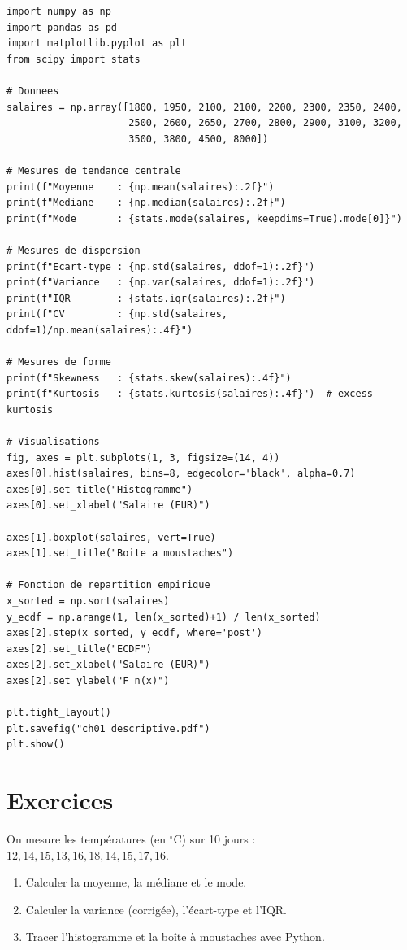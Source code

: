 \begin{python}
\begin{verbatim}
import numpy as np
import pandas as pd
import matplotlib.pyplot as plt
from scipy import stats

# Donnees
salaires = np.array([1800, 1950, 2100, 2100, 2200, 2300, 2350, 2400,
                     2500, 2600, 2650, 2700, 2800, 2900, 3100, 3200,
                     3500, 3800, 4500, 8000])

# Mesures de tendance centrale
print(f"Moyenne    : {np.mean(salaires):.2f}")
print(f"Mediane    : {np.median(salaires):.2f}")
print(f"Mode       : {stats.mode(salaires, keepdims=True).mode[0]}")

# Mesures de dispersion
print(f"Ecart-type : {np.std(salaires, ddof=1):.2f}")
print(f"Variance   : {np.var(salaires, ddof=1):.2f}")
print(f"IQR        : {stats.iqr(salaires):.2f}")
print(f"CV         : {np.std(salaires, ddof=1)/np.mean(salaires):.4f}")

# Mesures de forme
print(f"Skewness   : {stats.skew(salaires):.4f}")
print(f"Kurtosis   : {stats.kurtosis(salaires):.4f}")  # excess kurtosis

# Visualisations
fig, axes = plt.subplots(1, 3, figsize=(14, 4))
axes[0].hist(salaires, bins=8, edgecolor='black', alpha=0.7)
axes[0].set_title("Histogramme")
axes[0].set_xlabel("Salaire (EUR)")

axes[1].boxplot(salaires, vert=True)
axes[1].set_title("Boite a moustaches")

# Fonction de repartition empirique
x_sorted = np.sort(salaires)
y_ecdf = np.arange(1, len(x_sorted)+1) / len(x_sorted)
axes[2].step(x_sorted, y_ecdf, where='post')
axes[2].set_title("ECDF")
axes[2].set_xlabel("Salaire (EUR)")
axes[2].set_ylabel("F_n(x)")

plt.tight_layout()
plt.savefig("ch01_descriptive.pdf")
plt.show()
\end{verbatim}
\end{python}

\section{Exercices}

\begin{exercice}
On mesure les temp\'eratures (en ${}^\circ$C) sur 10 jours : $12, 14, 15, 13, 16, 18, 14, 15, 17, 16$.
\begin{enumerate}
\item Calculer la moyenne, la m\'ediane et le mode.
\item Calculer la variance (corrig\'ee), l'\'ecart-type et l'IQR.
\item Tracer l'histogramme et la bo\^ite \`a moustaches avec Python.
\end{enumerate}
\end{exercice}

